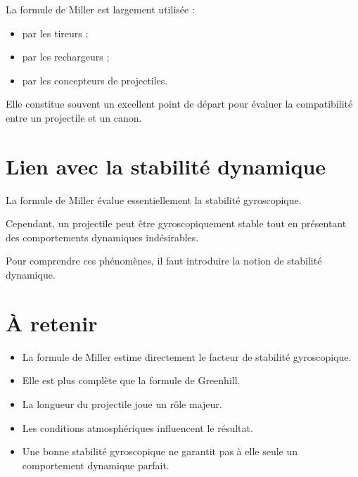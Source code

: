 La formule de Miller est largement utilisée :

\begin{itemize}
    \item par les tireurs ;
    \item par les rechargeurs ;
    \item par les concepteurs de projectiles.
\end{itemize}

Elle constitue souvent un excellent point de départ pour évaluer la
compatibilité entre un projectile et un canon.

\section{Lien avec la stabilité dynamique}

La formule de Miller évalue essentiellement la stabilité gyroscopique.

Cependant, un projectile peut être gyroscopiquement stable tout en présentant
des comportements dynamiques indésirables.

Pour comprendre ces phénomènes, il faut introduire la notion de stabilité
dynamique.

\section{À retenir}

\begin{aretenir}

\begin{itemize}
    \item La formule de Miller estime directement le facteur de stabilité
          gyroscopique.
    \item Elle est plus complète que la formule de Greenhill.
    \item La longueur du projectile joue un rôle majeur.
    \item Les conditions atmosphériques influencent le résultat.
    \item Une bonne stabilité gyroscopique ne garantit pas à elle seule un
          comportement dynamique parfait.
\end{itemize}

\end{aretenir}

